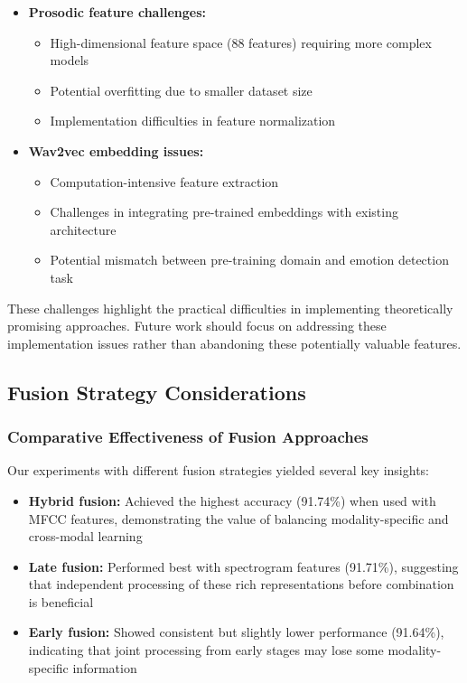 \documentclass[12pt]{article}
\begin{document}
\begin{itemize}
    \item \textbf{Prosodic feature challenges:}
    \begin{itemize}
        \item High-dimensional feature space (88 features) requiring more complex models
        \item Potential overfitting due to smaller dataset size
        \item Implementation difficulties in feature normalization
    \end{itemize}
    
    \item \textbf{Wav2vec embedding issues:}
    \begin{itemize}
        \item Computation-intensive feature extraction
        \item Challenges in integrating pre-trained embeddings with existing architecture
        \item Potential mismatch between pre-training domain and emotion detection task
    \end{itemize}
\end{itemize}

These challenges highlight the practical difficulties in implementing theoretically promising approaches. Future work should focus on addressing these implementation issues rather than abandoning these potentially valuable features.

\subsection{Fusion Strategy Considerations}
\subsubsection{Comparative Effectiveness of Fusion Approaches}
Our experiments with different fusion strategies yielded several key insights:

\begin{itemize}
    \item \textbf{Hybrid fusion:} Achieved the highest accuracy (91.74\%) when used with MFCC features, demonstrating the value of balancing modality-specific and cross-modal learning
    
    \item \textbf{Late fusion:} Performed best with spectrogram features (91.71\%), suggesting that independent processing of these rich representations before combination is beneficial
    
    \item \textbf{Early fusion:} Showed consistent but slightly lower performance (91.64\%), indicating that joint processing from early stages may lose some modality-specific information
\end{itemize}
\end{document}
